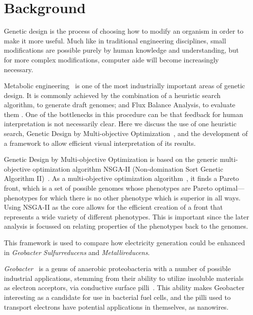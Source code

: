 \documentclass[a4paper,11pt]{article}
\begin{document}
\section{Background}

Genetic design is the process of choosing how to modify an organism in order to make it more useful. Much like in traditional engineering disciplines, small modifications are possible purely by human knowledge and understanding, but for more complex modifications, computer aide will become increasingly necessary.

Metabolic engineering~\cite{stephanopoulos1999metabolic} is one of the most industrially important areas of genetic design. It is commonly achieved by the combination of a heuristic search algorithm, to generate draft genomes; and Flux Balance Analysis, to evaluate them \cite{Orth2010}. One of the bottlenecks in this procedure can be that feedback for human interpretation is not necessarily clear. Here we discuss the use of one heuristic search, Genetic Design by Multi-objective Optimization~\cite{Costanza2012}, and the development of a framework to allow efficient visual interpretation of its results.

Genetic Design by Multi-objective Optimization is based on the generic multi-objective optimization algorithm NSGA-II (Non-domination Sort Genetic Algorithm II)~\cite{Deb2002a}. As a multi-objective optimization  algorithm~\cite{Gen2008}, it finds a Pareto front, which is a set of possible genomes whose phenotypes are Pareto optimal---phenotypes for which there is no other phenotype which is superior in all ways. Using NSGA-II as the core allows for the efficient creation of a front that represents a wide variety of different phenotypes. This is important since the later analysis is focussed on relating properties of the phenotypes back to the genomes.

This framework is used to compare how electricity generation could be enhanced in {\it Geobacter} {\it Sulfurreducens} and {\it Metallireducens}.

{\it Geobacter}~\cite{Lovley2011} is a genus of anaerobic proteobacteria with a number of possible industrial applications, stemming from their ability to utilize insoluble materials as electron acceptors, via conductive surface pilli~\cite{Bond2003}. This ability makes Geobacter interesting as a candidate for use in bacterial fuel cells, and the pilli used to transport electrons have potential applications in themselves, as nanowires.
\end{document}
